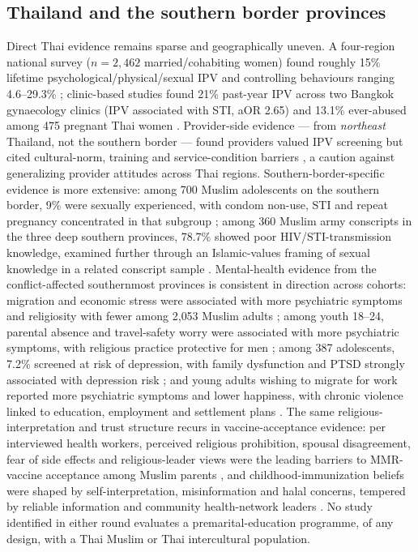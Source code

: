 \subsection{Thailand and the southern border provinces}
Direct Thai evidence remains sparse and geographically uneven. A four-region national survey ($n=2{,}462$ married/cohabiting women) found roughly 15\% lifetime psychological/physical/sexual IPV and controlling behaviours ranging 4.6--29.3\% \cite{ref72}; clinic-based studies found 21\% past-year IPV across two Bangkok gynaecology clinics (IPV associated with STI, aOR 2.65) \cite{ref73} and 13.1\% ever-abused among 475 pregnant Thai women \cite{ref74}. Provider-side evidence --- from \emph{northeast} Thailand, not the southern border --- found providers valued IPV screening but cited cultural-norm, training and service-condition barriers \cite{ref75}, a caution against generalizing provider attitudes across Thai regions. Southern-border-specific evidence is more extensive: among 700 Muslim adolescents on the southern border, 9\% were sexually experienced, with condom non-use, STI and repeat pregnancy concentrated in that subgroup \cite{ref76}; among 360 Muslim army conscripts in the three deep southern provinces, 78.7\% showed poor HIV/STI-transmission knowledge, examined further through an Islamic-values framing of sexual knowledge in a related conscript sample \cite{ref77,ref78}. Mental-health evidence from the conflict-affected southernmost provinces is consistent in direction across cohorts: migration and economic stress were associated with more psychiatric symptoms and religiosity with fewer among 2{,}053 Muslim adults \cite{ref79}; among youth 18--24, parental absence and travel-safety worry were associated with more psychiatric symptoms, with religious practice protective for men \cite{ref80}; among 387 adolescents, 7.2\% screened at risk of depression, with family dysfunction and PTSD strongly associated with depression risk \cite{ref81}; and young adults wishing to migrate for work reported more psychiatric symptoms and lower happiness, with chronic violence linked to education, employment and settlement plans \cite{ref82}. The same religious-interpretation and trust structure recurs in vaccine-acceptance evidence: per interviewed health workers, perceived religious prohibition, spousal disagreement, fear of side effects and religious-leader views were the leading barriers to MMR-vaccine acceptance among Muslim parents \cite{ref83}, and childhood-immunization beliefs were shaped by self-interpretation, misinformation and halal concerns, tempered by reliable information and community health-network leaders \cite{ref84}. No study identified in either round evaluates a premarital-education programme, of any design, with a Thai Muslim or Thai intercultural population.

